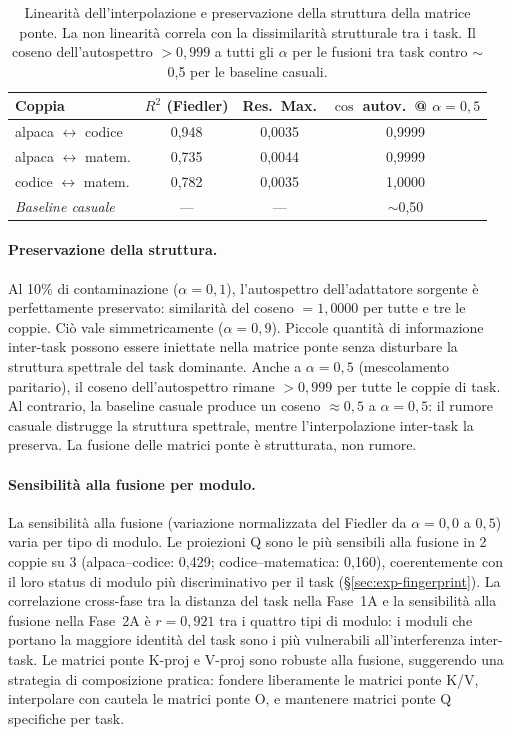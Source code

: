 \documentclass[11pt]{article}
\begin{document}
\begin{table}[t]
\centering
\caption{Linearit\`a dell'interpolazione e preservazione della struttura
della matrice ponte. La non linearit\`a correla con la dissimilarit\`a
strutturale tra i task. Il coseno dell'autospettro $> 0{,}999$ a tutti
gli $\alpha$ per le fusioni tra task contro $\sim$0,5 per le baseline
casuali.}
\label{tab:merge-linearity}
\small
\begin{tabular}{@{}lccc@{}}
\toprule
Coppia & $R^2$ (Fiedler) & Res.\ Max. & $\cos$ autov.\ @ $\alpha\!=\!0{,}5$ \\
\midrule
alpaca $\leftrightarrow$ codice & 0,948 & 0,0035 & 0,9999 \\
alpaca $\leftrightarrow$ matem. & 0,735 & 0,0044 & 0,9999 \\
codice $\leftrightarrow$ matem.   & 0,782 & 0,0035 & 1,0000 \\
\midrule
\textit{Baseline casuale}      & --- & --- & $\sim$0,50 \\
\bottomrule
\end{tabular}
\end{table}

\paragraph{Preservazione della struttura.}
Al 10\% di contaminazione ($\alpha = 0{,}1$), l'autospettro
dell'adattatore sorgente \`e perfettamente preservato: similarit\`a del
coseno $= 1{,}0000$ per tutte e tre le coppie. Ci\`o vale
simmetricamente ($\alpha = 0{,}9$). Piccole quantit\`a di informazione
inter-task possono essere iniettate nella matrice ponte senza
disturbare la struttura spettrale del task dominante. Anche a
$\alpha = 0{,}5$ (mescolamento paritario), il coseno dell'autospettro
rimane $> 0{,}999$ per tutte le coppie di task. Al contrario, la
baseline casuale produce un coseno $\approx 0{,}5$ a $\alpha = 0{,}5$:
il rumore casuale distrugge la struttura spettrale, mentre
l'interpolazione inter-task la preserva. La fusione delle matrici ponte
\`e strutturata, non rumore.

\paragraph{Sensibilit\`a alla fusione per modulo.}
La sensibilit\`a alla fusione (variazione normalizzata del Fiedler da
$\alpha = 0{,}0$ a $0{,}5$) varia per tipo di modulo. Le proiezioni Q
sono le pi\`u sensibili alla fusione in 2 coppie su 3
(alpaca--codice: 0,429; codice--matematica: 0,160), coerentemente con il
loro status di modulo pi\`u discriminativo per il task
(\S\ref{sec:exp-fingerprint}).
La correlazione cross-fase tra la distanza del task nella Fase~1A e la
sensibilit\`a alla fusione nella Fase~2A \`e $r = 0{,}921$ tra i
quattro tipi di modulo: i moduli che portano la maggiore identit\`a del
task sono i pi\`u vulnerabili all'interferenza inter-task. Le matrici
ponte K-proj e V-proj sono robuste alla fusione, suggerendo una
strategia di composizione pratica: fondere liberamente le matrici ponte
K/V, interpolare con cautela le matrici ponte O, e mantenere matrici
ponte Q specifiche per task.
\end{document}
